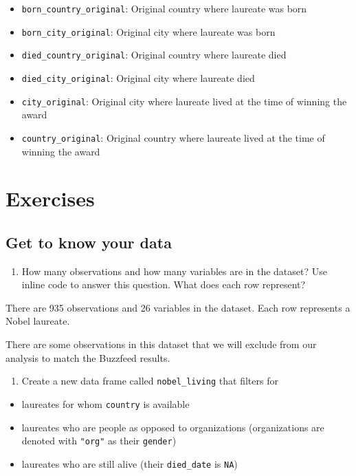\documentclass[
]{article}
\providecommand{\tightlist}{%
  \setlength{\itemsep}{0pt}\setlength{\parskip}{0pt}}
\begin{document}
\begin{itemize}
\tightlist
\item
  \texttt{born\_country\_original}: Original country where laureate was
  born
\item
  \texttt{born\_city\_original}: Original city where laureate was born
\item
  \texttt{died\_country\_original}: Original country where laureate died
\item
  \texttt{died\_city\_original}: Original city where laureate died
\item
  \texttt{city\_original}: Original city where laureate lived at the
  time of winning the award
\item
  \texttt{country\_original}: Original country where laureate lived at
  the time of winning the award
\end{itemize}

\section{Exercises}\label{exercises}

\subsection{Get to know your data}\label{get-to-know-your-data}

\begin{enumerate}
\def\labelenumi{\arabic{enumi}.}
\tightlist
\item
  How many observations and how many variables are in the dataset? Use
  inline code to answer this question. What does each row represent?
\end{enumerate}

There are 935 observations and 26 variables in the dataset. Each row
represents a Nobel laureate.

There are some observations in this dataset that we will exclude from
our analysis to match the Buzzfeed results.

\begin{enumerate}
\def\labelenumi{\arabic{enumi}.}
\setcounter{enumi}{1}
\tightlist
\item
  Create a new data frame called \texttt{nobel\_living} that filters for
\end{enumerate}

\begin{itemize}
\tightlist
\item
  laureates for whom \texttt{country} is available
\item
  laureates who are people as opposed to organizations (organizations
  are denoted with \texttt{"org"} as their \texttt{gender})
\item
  laureates who are still alive (their \texttt{died\_date} is
  \texttt{NA})
\end{itemize}
\end{document}

